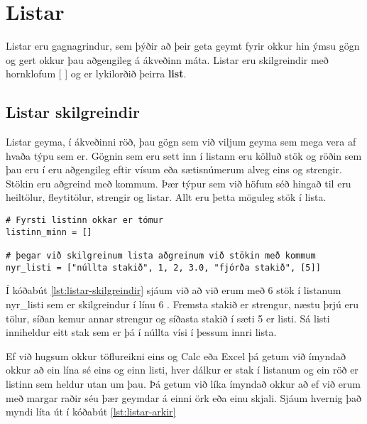
\chapter{Listar}\label{k:listar}
Listar eru gagnagrindur, sem þýðir að þeir geta geymt fyrir okkur hin ýmsu gögn og gert okkur þau aðgengileg á ákveðinn máta.
Listar eru skilgreindir með hornklofum [ ] og er lykilorðið þeirra \textbf{list}.

\section{Listar skilgreindir}\label{uk:listar-skilgreindir}
Listar geyma, í ákveðinni röð, þau gögn sem við viljum geyma sem mega vera af hvaða týpu sem er.
Gögnin sem eru sett inn í listann eru kölluð stök og röðin sem þau eru í eru aðgengileg eftir vísum eða sætisnúmerum alveg eins og strengir.
Stökin eru aðgreind með kommum.
Þær týpur sem við höfum séð hingað til eru heiltölur, fleytitölur, strengir og listar.
Allt eru þetta möguleg stök í lista.

\begin{lstlisting}[caption=Listar skilgreindir, label=lst:listar-skilgreindir]
# Fyrsti listinn okkar er tómur
listinn_minn = []

# þegar við skilgreinum lista aðgreinum við stökin með kommum
nyr_listi = ["núllta stakið", 1, 2, 3.0, "fjórða stakið", [5]]
\end{lstlisting}

Í kóðabút \ref{lst:listar-skilgreindir} sjáum við að við erum með 6 stök í listanum nyr\_listi sem er skilgreindur í línu 6 .
Fremsta stakið er strengur, næstu þrjú eru tölur, síðan kemur annar strengur og síðasta stakið í sæti 5 er listi.
Sá listi inniheldur eitt stak sem er þá í núllta vísi í þessum innri lista.

Ef við hugsum okkur töflureikni eins og Calc eða Excel þá getum við ímyndað okkur að ein lína sé eins og einn listi, hver dálkur er stak í listanum og ein röð er listinn sem heldur utan um þau.
Þá getum við líka ímyndað okkur að ef við erum með margar raðir séu þær geymdar á einni örk eða einu skjali.
Sjáum hvernig það myndi líta út í kóðabút \ref{lst:listar-arkir}

